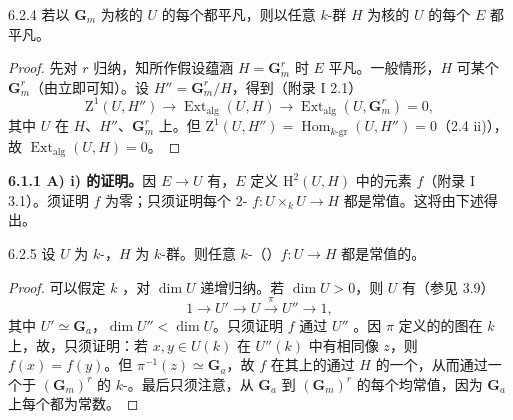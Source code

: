 \begin{SGAresult}{}{6.2.4}
若以 $\mathbf G_m$ 为核的 $U$ 的每个都平凡，则以任意 $k$-群 $H$ 为核的 $U$ 的每个 $E$ 都平凡。
\end{SGAresult}
\begin{proof}
先对 $r$ 归纳，知所作假设蕴涵 $H=\mathbf G_m^r$ 时 $E$ 平凡。一般情形，$H$ 可某个 $\mathbf G_m^r$（由立即可知）。设 $H''=\mathbf G_m^r/H$，得到（附录 I 2.1）
\[\mathrm Z^1(U,H'')\longrightarrow\operatorname{Ext}_{\mathrm{alg}}(U,H)\longrightarrow\operatorname{Ext}_{\mathrm{alg}}(U,\mathbf G_m^r)=0,\]
其中 $U$ 在 $H$、$H''$、$\mathbf G_m^r$ 上。但 $\mathrm Z^1(U,H'')=\operatorname{Hom}_{k\text{-gr}}(U,H'')=0$（2.4 ii)），故 $\operatorname{Ext}_{\mathrm{alg}}(U,H)=0$。
\end{proof}
\textbf{6.1.1 A) i) 的证明。}因 $E\to U$ 有，$E$ 定义 $\mathrm H^2(U,H)$ 中的元素 $f$（附录 I 3.1）。须证明 $f$ 为零；只须证明每个 $2$- $f:U\times_kU\to H$ 都是常值。这将由下述得出。
\begin{SGAresult}{}{6.2.5}
设 $U$ 为 $k$-，$H$ 为 $k$-群。则任意 $k$-（）$f:U\to H$ 都是常值的。
\end{SGAresult}
\begin{proof}
可以假定 $k$ ，对 $\dim U$ 递增归纳。若 $\dim U>0$，则 $U$ 有（参见 3.9）
\[1\longrightarrow U'\longrightarrow U\xrightarrow\pi U''\longrightarrow1,\]
其中 $U'\simeq\mathbf G_a$，$\dim U''<\dim U$。只须证明 $f$ 通过 $U''$ 。因 $\pi$ 定义的的图在 $k$ 上，故，只须证明：若 $x,y\in U(k)$ 在 $U''(k)$ 中有相同像 $z$，则 $f(x)=f(y)$。但 $\pi^{-1}(z)\simeq\mathbf G_a$，故 $f$ 在其上的通过 $H$ 的一个，从而通过一个于 $(\mathbf G_m)^r$ 的 $k$-。最后只须注意，从 $\mathbf G_a$ 到 $(\mathbf G_m)^r$ 的每个均常值，因为 $\mathbf G_a$ 上每个都为常数。
\end{proof}
